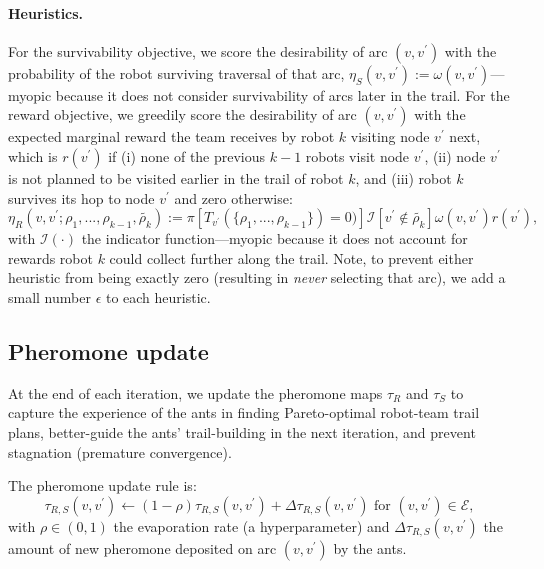 \documentclass[fleqn,10pt,lineno]{wlpeerj}
\begin{document}

\paragraph{Heuristics.} 
For the survivability objective, we score the desirability of arc $(v, v^\prime)$ with the probability of the robot surviving traversal of that arc, $\eta_S(v, v^\prime):=\omega(v, v^\prime)$---myopic because it does not consider survivability of arcs later in the trail. 
For the reward objective, we greedily score the desirability of arc $(v, v^\prime)$ with the expected marginal reward the team receives by robot $k$ visiting node $v^\prime$ next, which is $r(v^\prime)$ if 
(i) none of the previous $k-1$ robots visit node $v^\prime$, 
(ii) node $v^\prime$ is not planned to be visited earlier in the trail of robot $k$, and
(iii) robot $k$ survives its hop to node $v^\prime$
and zero otherwise:
\begin{equation}
	\eta_R(v, v^\prime; \rho_1, ..., \rho_{k-1}, \tilde{\rho_k}) :=  
	 \pi[ T_{v^\prime}(\{\rho_1, ..., \rho_{k-1}\}) = 0)] \mathcal{I}[v^\prime \notin \tilde{\rho_k}] \omega(v, v^\prime) r(v^\prime ) ,
\end{equation}
with $\mathcal{I}(\cdot)$ the indicator function---myopic because it does not account for rewards robot $k$ could collect further along the trail. 
Note, to prevent either heuristic from being exactly zero (resulting in \emph{never} selecting that arc), we add a small number $\epsilon$ to each heuristic.


\subsection{Pheromone update}
At the end of each iteration, we update the pheromone maps $\tau_R$ and $\tau_S$ to capture the experience of the ants in finding Pareto-optimal robot-team trail plans, better-guide the ants' trail-building in the next iteration, and prevent stagnation (premature convergence). 


The pheromone update rule is:
\begin{equation}
	\tau_{R, S}(v, v^\prime) \leftarrow (1-\rho) \tau_{R,S}(v, v^\prime)  + \Delta \tau_{R,S}(v, v^\prime) \text{ for } (v, v^\prime) \in \mathcal{E}, \label{eq:tau_update}
\end{equation}
with $\rho \in (0, 1)$ the evaporation rate (a hyperparameter) and $\Delta \tau_{R,S}(v, v^\prime)$ the amount of new pheromone deposited on arc $(v, v^\prime)$ by the ants.
\end{document}

